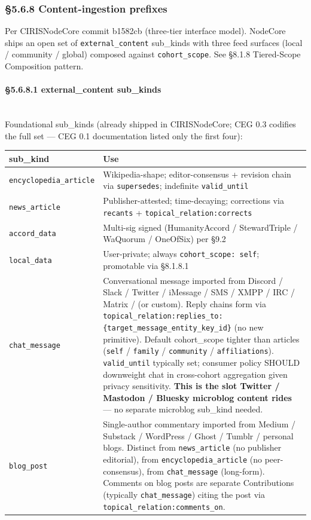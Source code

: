 \documentclass[11pt]{article}
\begin{document}
\subsubsection*{§5.6.8 Content-ingestion prefixes}


Per CIRISNodeCore commit b1582cb (three-tier interface model). NodeCore ships an open set of \texttt{external\_content} sub\_kinds with three feed surfaces (local / community / global) composed against \texttt{cohort\_scope}. See §8.1.8 Tiered-Scope Composition pattern.


\paragraph{§5.6.8.1 external\_content sub\_kinds}\mbox{}\\


Foundational sub\_kinds (already shipped in CIRISNodeCore; CEG 0.3 codifies the full set — CEG 0.1 documentation listed only the first four):


{\footnotesize
\begin{longtable}{|p{8.0cm}|p{8.0cm}|}\hline
\textbf{sub\_kind} & \textbf{Use} \\ \hline\endhead
\texttt{encyclopedia\_article} & Wikipedia-shape; editor-consensus + revision chain via \texttt{supersedes}; indefinite \texttt{valid\_until} \\ \hline
\texttt{news\_article} & Publisher-attested; time-decaying; corrections via \texttt{recants} + \texttt{topical\_relation:corrects} \\ \hline
\texttt{accord\_data} & Multi-sig signed (HumanityAccord / StewardTriple / WaQuorum / OneOfSix) per §9.2 \\ \hline
\texttt{local\_data} & User-private; always \texttt{cohort\_scope: self}; promotable via §8.1.8.1 \\ \hline
\texttt{chat\_message} & Conversational message imported from Discord / Slack / Twitter / iMessage / SMS / XMPP / IRC / Matrix / (or custom). Reply chains form via \texttt{topical\_relation:replies\_to:\{target\_message\_entity\_key\_id\}} (no new primitive). Default cohort\_scope tighter than articles (\texttt{self} / \texttt{family} / \texttt{community} / \texttt{affiliations}). \texttt{valid\_until} typically set; consumer policy SHOULD downweight chat in cross-cohort aggregation given privacy sensitivity. \textbf{This is the slot Twitter / Mastodon / Bluesky microblog content rides} — no separate microblog sub\_kind needed. \\ \hline
\texttt{blog\_post} & Single-author commentary imported from Medium / Substack / WordPress / Ghost / Tumblr / personal blogs. Distinct from \texttt{news\_article} (no publisher editorial), from \texttt{encyclopedia\_article} (no peer-consensus), from \texttt{chat\_message} (long-form). Comments on blog posts are separate Contributions (typically \texttt{chat\_message}) citing the post via \texttt{topical\_relation:comments\_on}. \\ \hline
\end{longtable}}
\end{document}
